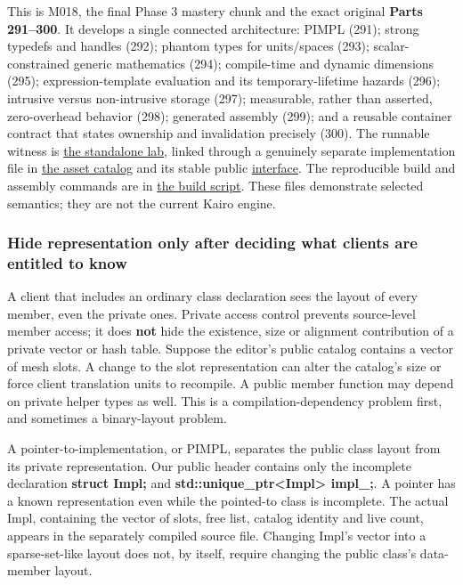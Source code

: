 This is M018, the final Phase 3 mastery chunk and the exact original \textbf{Parts 291--300}. It develops a single connected architecture: PIMPL (291); strong typedefs and handles (292); phantom types for units/spaces (293); scalar-constrained generic mathematics (294); compile-time and dynamic dimensions (295); expression-template evaluation and its temporary-lifetime hazards (296); intrusive versus non-intrusive storage (297); measurable, rather than asserted, zero-overhead behavior (298); generated assembly (299); and a reusable container contract that states ownership and invalidation precisely (300). The runnable witness is \href{tools/m018/m018_lab.cpp}{the standalone lab}, linked through a genuinely separate implementation file in \href{tools/m018/asset_catalog.cpp}{the asset catalog} and its stable public \href{tools/m018/asset_catalog.hpp}{interface}. The reproducible build and assembly commands are in \href{tools/m018/build_m018_lab.sh}{the build script}. These files demonstrate selected semantics; they are not the current Kairo engine.

\subsubsection{Hide representation only after deciding what clients are entitled to know}\label{hide-representation-only-after-deciding-what-clients-are-entitled-to-know}

A client that includes an ordinary class declaration sees the layout of every member, even the private ones. Private access control prevents source-level member access; it does \textbf{not} hide the existence, size or alignment contribution of a private vector or hash table. Suppose the editor's public catalog contains a vector of mesh slots. A change to the slot representation can alter the catalog's size or force client translation units to recompile. A public member function may depend on private helper types as well. This is a compilation-dependency problem first, and sometimes a binary-layout problem.

A pointer-to-implementation, or PIMPL, separates the public class layout from its private representation. Our public header contains only the incomplete declaration \textbf{struct Impl;} and \textbf{std::unique\_ptr\textless Impl\textgreater{} impl\_;}. A pointer has a known representation even while the pointed-to class is incomplete. The actual Impl, containing the vector of slots, free list, catalog identity and live count, appears in the separately compiled source file. Changing Impl's vector into a sparse-set-like layout does not, by itself, require changing the public class's data-member layout.


